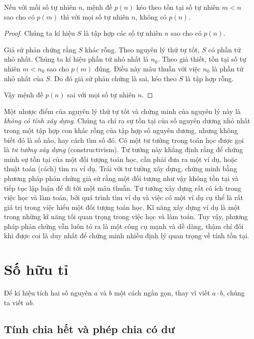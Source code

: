 \begin{theorem}
	Nếu với mỗi số tự nhiên $n$, mệnh đề $p(n)$ kéo theo tồn tại số tự nhiên $m < n$ sao cho có $p(m)$ thì với mọi số tự nhiên $n$, không có $p(n)$.
\end{theorem}

\begin{proof}
	Chúng ta kí hiệu $S$ là tập hợp các số tự nhiên $n$ sao cho có $p(n)$.

	Giả sử phản chứng rằng $S$ khác rỗng. Theo nguyên lý thứ tự tốt, $S$ có phần tử nhỏ nhất. Chúng ta kí hiệu phần tử nhỏ nhất là $n_{0}$. Theo giả thiết, tồn tại số tự nhiên $m < n_{0}$ sao cho $p(m)$ đúng. Điều này mâu thuẫn với việc $n_{0}$ là phần tử nhỏ nhất của $S$. Do đó giả sử phản chứng là sai, kéo theo $S$ là tập hợp rỗng.

	Vậy mệnh đề $p(n)$ sai với mọi số tự nhiên $n$.
\end{proof}

Một nhược điểm của nguyên lý thứ tự tốt và chứng minh của nguyên lý này là \textit{không có tính xây dựng}. Chúng ta chỉ ra sự tồn tại của số nguyên dương nhỏ nhất trong một tập hợp con khác rỗng của tập hợp số nguyên dương, nhưng không biết đó là số nào, hay cách tìm số đó. Có một tư tưởng trong toán học được gọi là \textit{tư tưởng xây dựng} (constructivism). Tư tưởng này khẳng định rằng để chứng minh sự tồn tại của một đối tượng toán học, cần phải đưa ra một ví dụ, hoặc thuật toán (cách) tìm ra ví dụ. Trái với tư tưởng xây dựng, chứng minh bằng phương pháp phản chứng giả sử rằng một đối tượng như vậy không tồn tại và tiếp tục lập luận để đi tới một mâu thuẫn. Tư tưởng xây dựng rất có ích trong việc học và làm toán, bởi quá trình tìm ví dụ và việc có một ví dụ cụ thể là rất giá trị trong việc hiểu một đối tượng toán học. Kĩ năng xây dựng ví dụ là một trong những kĩ năng tối quan trọng trong việc học và làm toán. Tuy vậy, phương pháp phản chứng vẫn luôn tỏ ra là một công cụ mạnh và dễ dàng, thậm chí đôi khi được coi là duy nhất để chứng minh nhiều định lý quan trọng về tính tồn tại.

\section{Số hữu tỉ}\label{section:rationals}

Để kí hiệu tích hai số nguyên $a$ và $b$ một cách ngắn gọn, thay vì viết $a\cdot b$, chúng ta viết $ab$.

\subsection{Tính chia hết và phép chia có dư}

